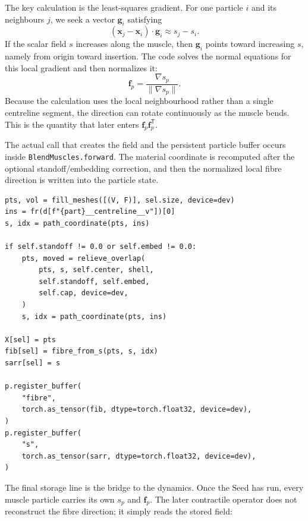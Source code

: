 \documentclass[11pt]{article}
\newcommand{\vect}[1]{\bm{#1}}
\begin{document}
The key calculation is the least-squares gradient. For one particle $i$ and its
neighbours $j$, we seek a vector $\vect g_i$ satisfying
\begin{equation}
(\vect x_j-\vect x_i)\cdot\vect g_i \approx s_j-s_i.
\label{eq:auto24}
\end{equation}
If the scalar field $s$ increases along the muscle, then $\vect g_i$ points toward
increasing $s$, namely from origin toward insertion. The code solves the normal equations
for this local gradient and then normalizes it:
\begin{equation}
\vect f_p
=
\frac{\nabla s_p}{\|\nabla s_p\|}.
\label{eq:auto25}
\end{equation}
Because the calculation uses the local neighbourhood rather than a single centreline
segment, the direction can rotate continuously as the muscle bends. This is the quantity
that later enters $\vect f_p\vect f_p^{\mathsf T}$.

The actual call that creates the field and the persistent particle buffer occurs inside
\texttt{BlendMuscles.forward}. The material coordinate is recomputed after the optional
standoff/embedding correction, and then the normalized local fibre direction is written
into the particle state.

\begin{lstlisting}[caption={\texttt{prototype/eye/blend\_mpm\_ops.py}: creation and storage of the particle fibre field. Source lines 2624--2698.},label={lst:fibre-buffer}]
pts, vol = fill_meshes([(V, F)], sel.size, device=dev)
ins = fr(d[f"{part}__centreline__v"])[0]
s, idx = path_coordinate(pts, ins)

if self.standoff != 0.0 or self.embed != 0.0:
    pts, moved = relieve_overlap(
        pts, s, self.center, shell,
        self.standoff, self.embed,
        self.cap, device=dev,
    )
    s, idx = path_coordinate(pts, ins)

X[sel] = pts
fib[sel] = fibre_from_s(pts, s, idx)
sarr[sel] = s

p.register_buffer(
    "fibre",
    torch.as_tensor(fib, dtype=torch.float32, device=dev),
)
p.register_buffer(
    "s",
    torch.as_tensor(sarr, dtype=torch.float32, device=dev),
)
\end{lstlisting}

The final storage line is the bridge to the dynamics. Once the Seed has run, every
muscle particle carries its own $s_p$ and $\vect f_p$. The later contractile operator does
not reconstruct the fibre direction; it simply reads the stored field:
\end{document}
